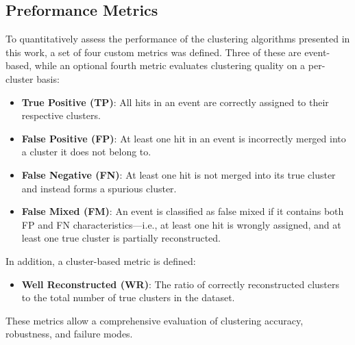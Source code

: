 \documentclass[final,5p,times,twocolumn]{elsarticle}
\begin{document}
\subsection{Preformance Metrics}\label{s_sec:metrics}
To quantitatively assess the performance of the clustering algorithms presented in this work, a set of four custom metrics was defined. Three of these are event-based, while an optional fourth metric evaluates clustering quality on a per-cluster basis:
\begin{itemize}
    \item \textbf{True Positive (TP)}: All hits in an event are correctly assigned to their respective clusters.
    \item \textbf{False Positive (FP)}: At least one hit in an event is incorrectly merged into a cluster it does not belong to.
    \item \textbf{False Negative (FN)}: At least one hit is not merged into its true cluster and instead forms a spurious cluster.
    \item \textbf{False Mixed (FM)}: An event is classified as false mixed if it contains both FP and FN characteristics—i.e., at least one hit is wrongly assigned, and at least one true cluster is partially reconstructed.
\end{itemize}
In addition, a cluster-based metric is defined:
\begin{itemize}
    \item \textbf{Well Reconstructed (WR)}: The ratio of correctly reconstructed clusters to the total number of true clusters in the dataset.
\end{itemize}
These metrics allow a comprehensive evaluation of clustering accuracy, robustness, and failure modes.
\end{document}
